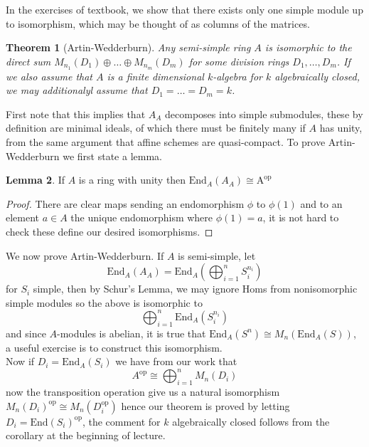 \documentclass{article}
\newtheorem{theorem}{Theorem}[section]
\theoremstyle{definition}
\newtheorem{lemma}[theorem]{Lemma}
\theoremstyle{remark}
\theoremstyle{plain}
\begin{document}
In the exercises of textbook, we show that there exists only one simple module up to isomorphism, which may be thought of as columns of the matrices.

\begin{theorem}[Artin-Wedderburn]
	Any semi-simple ring $A$ is isomorphic to the direct sum $M_{n_1}(D_1) \oplus \dots \oplus M_{n_m}(D_m)$ for some division rings $D_1, \dots, D_{m}$.
	If we also assume that $A$ is a finite dimensional $k$-algebra for $k$ algebraically closed, we may additionalyl assume that $D_1 = \dots = D_m = k$.
\end{theorem}

First note that this implies that $A_A$ decomposes into simple submodules, these by definition are minimal ideals, of which there must be finitely many if $A$ has unity, from the same argument that affine schemes are quasi-compact.
To prove Artin-Wedderburn we first state a lemma.

\begin{lemma}
	If $A$ is a ring with unity then $\text{End}_{A}(A_A) \cong \text{A}^{\text{op}}$
\end{lemma}

\begin{proof}
	There are clear maps sending an endomorphism $\phi$ to $\phi(1)$ and to an element $a \in A$ the unique endomorphism where $\phi(1) = a$, it is not hard to check these define our desired isomorphisms.
\end{proof}

We now prove Artin-Wedderburn.
If $A$ is semi-simple, let 
\[ \text{End}_A(A_A) = \text{End}_A(\bigoplus_{i=1}^n S_i^{n_i})\]
for $S_i$ simple, then by Schur's Lemma, we may ignore Homs from nonisomorphic simple modules so the above is isomorphic to 
\[\bigoplus_{i=1}^n \text{End}_A(S_i^{n_i})\]
and since $A$-modules is abelian, it is true that  $\text{End}_A(S^n) \cong M_n(\text{End}_A(S))$, a useful exercise is to construct this isomorphism.\\
Now if $D_i = \text{End}_A(S_i)$ we have from our work that 
\[A^{\text{op}} \cong \bigoplus_{i =1}^n M_n(D
_i)\]
now the transposition operation give us a natural isomorphism $M_n(D_i)^{\text{op}} \cong M_n(D_i^{\text{op}})$
hence our theorem is proved by letting $D_i = \text{End}(S_i)^{\text{op}}$, the comment for $k$ algebraically closed follows from the corollary at the beginning of lecture.
\end{document}
